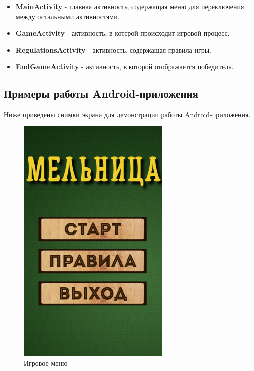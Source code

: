 \documentclass[a4paper]{article}
\begin{document}
\begin{itemize}

\item \textbf{MainActivity} - главная активность, содержащая меню для переключения между остальными активностями.

\item \textbf{GameActivity} - активность, в которой происходит игровой процесс.

\item \textbf{RegulationsActivity} - активность, содержащая правила игры.

\item \textbf{EndGameActivity} - активность, в которой отображается победитель.

\end{itemize}

\subsection{Примеры работы Android-приложения}

Ниже приведены снимки экрана для демонстрации работы Android-приложения.

\begin{figure}[H]
	\begin{center}
		\includegraphics[scale = 0.8]{screens/MainActivity.png}
		\caption{Игровое меню} 
		\label{pic:pic_name} %
	\end{center}
\end{figure}
\end{document}
